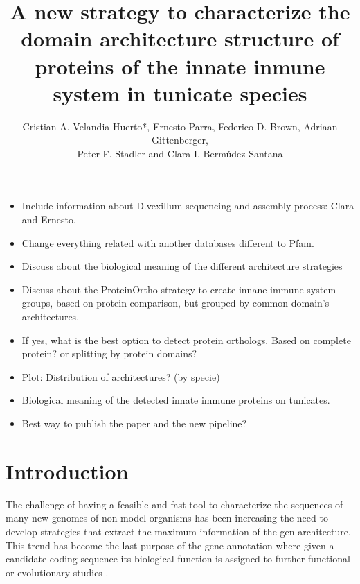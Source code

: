 \documentclass[11pt]{article}
\newcommand{\TODO}[1]{\begingroup\color{red}#1\endgroup}
\begin{document}
\title{A new strategy to characterize the domain architecture structure of 
proteins of the innate inmune system in tunicate species}
\author{Cristian A. Velandia-Huerto*, Ernesto Parra, Federico D. 
Brown, Adriaan Gittenberger, \\ Peter F. Stadler and Clara I. 
Berm\'{u}dez-Santana}


\maketitle

\begin{itemize}
\item \TODO{Include information about D.vexillum sequencing and assembly 
process: Clara and Ernesto.}
\item \TODO{Change everything related with another databases different to Pfam}. 
\item \TODO{Discuss about the biological meaning of the different architecture 
strategies}
\item \TODO{Discuss about the ProteinOrtho strategy to create innane immune 
system groups, based on protein comparison, but grouped by common domain's 
architectures}.
\item \TODO{If yes, what is the best option to detect protein orthologs. Based 
on complete protein? or splitting  by protein domains?}
\item \TODO{Plot: Distribution of architectures? (by specie)}
\item \TODO{Biological meaning of the detected innate immune proteins on 
tunicates.}
\item \TODO{Best way to publish the paper and the new pipeline?}
\end{itemize}


\section{Introduction}

The challenge of having a feasible and fast tool to characterize the sequences 
of many new genomes of non-model organisms has been increasing the need to 
develop strategies that extract the maximum information of the gen architecture. 
This trend has become the last purpose of the gene annotation where given a 
candidate coding sequence its biological function is assigned to further 
functional or evolutionary studies \cite{aken2016ensembl} 
\cite{birney2004overview} \cite{ashburner2000gene} \cite{tatusov2000cog} 
\cite{tatusova2016ncbi}. 
\end{document}
